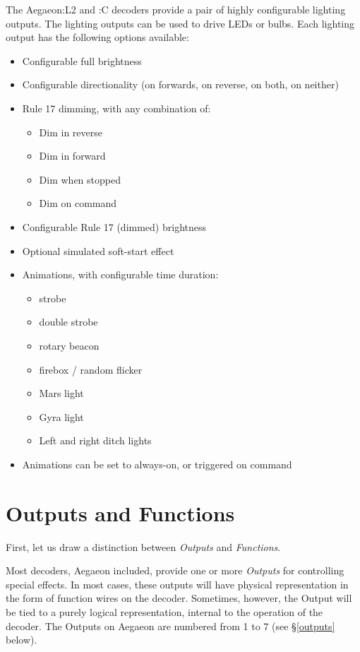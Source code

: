 \documentclass[12pt,letterpaper,draft]{memoir} %
\begin{document}
The Aegaeon:L2 and :C decoders provide a pair of highly configurable lighting outputs. The lighting outputs can be used to drive LEDs or bulbs. Each lighting output has the following options available:
\begin{itemize}
\item Configurable full brightness
\item Configurable directionality (on forwards, on reverse, on both, on neither)
\item Rule 17 dimming, with any combination of:
\begin{itemize}
\item Dim in reverse
\item Dim in forward
\item Dim when stopped
\item Dim on command
\end{itemize}
\item Configurable Rule 17 (dimmed) brightness
\item Optional simulated soft-start effect
\item Animations, with configurable time duration:
\begin{itemize}
\item strobe
\item double strobe
\item rotary beacon
\item firebox / random flicker
\item Mars light
\item Gyra light
\item Left and right ditch lights
\end{itemize}
\item Animations can be set to always-on, or triggered on command
\end{itemize}

\section{Outputs and Functions}

First, let us draw a distinction between \textit{Outputs} and \textit{Functions}.

Most decoders, Aegaeon included, provide one or more \textit{Outputs} for controlling special effects. In most cases, these outputs will have physical representation in the form of function wires on the decoder. Sometimes, however, the Output will be tied to a purely logical representation, internal to the operation of the decoder. The Outputs on Aegaeon are numbered from 1 to 7 (see \S\ref{outputs} below).
\end{document}

